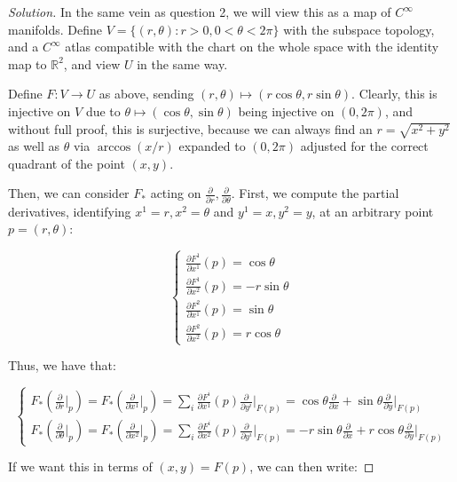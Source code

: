 \documentclass[10pt]{article}
\begin{document}
\begin{proof}[Solution]

In the same vein as question 2, we will view this as a map of $C^\infty$ manifolds. Define $V = \{ (r, \theta) : r > 0, 0 < \theta < 2\pi \}$ with the subspace topology, and a $C^\infty$ atlas compatible with the chart on the whole space with the identity map to $\mathbb{R}^2$, and view $U$ in the same way.

Define $F: V \to U$ as above, sending $(r, \theta) \mapsto (r \cos \theta, r \sin \theta)$. Clearly, this is injective on $V$ due to $\theta \mapsto (\cos\theta, \sin \theta)$ being injective on $(0,2\pi)$, and without full proof, this is surjective, because we can always find an $r = \sqrt{x^2 + y^2}$ as well as $\theta$ via $\arccos(x/r)$ expanded to $(0,2\pi)$ adjusted for the correct quadrant of the point $(x,y)$.

Then, we can consider $F_*$ acting on  $\frac{\partial}{\partial r}, \frac{\partial}{\partial \theta}$. First, we compute the partial derivatives, identifying $x^1 = r, x^2 = \theta$ and $y^1 = x, y^2 = y$, at an arbitrary point $p = (r,\theta)$:

$$ \begin{cases} \frac{\partial F^1}{ \partial x^1}(p) = \cos \theta \\ \frac{\partial F^1}{ \partial x^2}(p) = - r\sin \theta \\ \frac{\partial F^2}{ \partial x^1}(p) = \sin \theta \\ \frac{\partial F^2}{ \partial x^2}(p) = r \cos \theta \end{cases} $$

Thus, we have that:

$$\begin{cases}  F_*\left( \frac{\partial}{\partial r} \bigg|_p \right) =  F_*\left( \frac{\partial}{\partial x^1} \bigg|_p \right) = \sum_{i} \frac{\partial F^i}{ \partial x^1}(p) \frac{\partial}{\partial y^i} \bigg|_{F(p)} = \cos \theta \frac{\partial}{\partial x}  + \sin \theta \frac{\partial}{\partial y}  \bigg|_{F(p)} \\ F_*\left( \frac{\partial}{\partial \theta} \bigg|_p \right) =  F_*\left( \frac{\partial}{\partial x^2} \bigg|_p \right) = \sum_{i} \frac{\partial F^i}{ \partial x^2}(p) \frac{\partial}{\partial y^i} \bigg|_{F(p)} = -r\sin \theta \frac{\partial}{\partial x}  + r\cos \theta \frac{\partial}{\partial y}  \bigg|_{F(p)} \end{cases}$$

If we want this in terms of $(x,y) = F(p)$, we can then write:


\end{proof}
\end{document}

